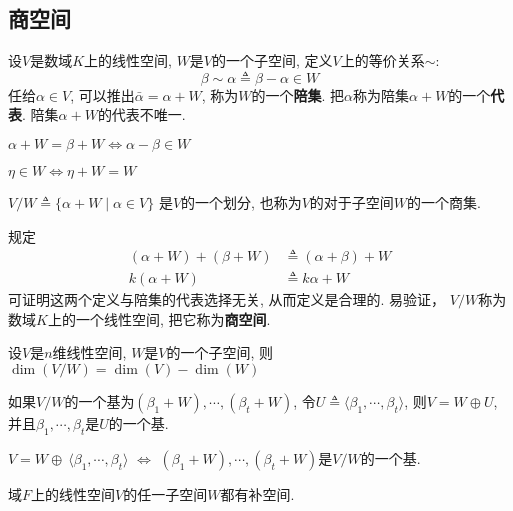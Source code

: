 \subsection{商空间}

\begin{Note}
设$V$是数域$K$上的线性空间, $W$是$V$的一个子空间, 定义$V$上的等价关系$\sim$: 
\[ \beta \sim \alpha \triangleq \beta - \alpha \in W \]
任给$\alpha \in V$, 可以推出$\bar{\alpha} = \alpha + W$, 称为$W$的一个\textbf{陪集}. 把$\alpha$称为陪集$\alpha + W$的一个\textbf{代表}. 陪集$\alpha + W$的代表不唯一.
\end{Note}

\begin{Note}
$\alpha + W = \beta + W \iff \alpha - \beta \in W$
\end{Note}

\begin{Note}
$\eta \in W \iff \eta + W = W$
\end{Note}

\begin{Note}
$V / W \triangleq \{ \alpha + W \mid \alpha \in V\}$
是$V$的一个划分, 也称为$V$的对于子空间$W$的一个商集.
\end{Note}

\begin{Note}规定
\[
\begin{aligned}
(\alpha + W) + (\beta + W) &\triangleq (\alpha + \beta) + W \\
k(\alpha + W) &\triangleq k \alpha +W 
\end{aligned}
\]
可证明这两个定义与陪集的代表选择无关, 从而定义是合理的. 
易验证， $V/W$称为数域$K$上的一个线性空间, 把它称为\textbf{商空间}.
\end{Note}

\begin{Theorem}
设$V$是$n$维线性空间, $W$是$V$的一个子空间, 则$ \dim(V/W) = \dim(V) - \dim(W) $
\end{Theorem}

\begin{Theorem}
如果$V/W$的一个基为$(\beta_1 + W), \cdots, (\beta_t + W)$, 令$U \triangleq \langle \beta_1, \cdots, \beta_t \rangle$, 则$V = W \oplus U$, 并且$\beta_1, \cdots, \beta_t$是$U$的一个基.
\end{Theorem}

\begin{Note}
$V = W \oplus ~ \langle \beta_1, \cdots, \beta_t \rangle$ $\iff$
$(\beta_{1} +W), \cdots, (\beta_{t}+W)$是$V/W$的一个基.
\end{Note}

\begin{Proposition}
域$F$上的线性空间$V$的任一子空间$W$都有补空间.
\end{Proposition}